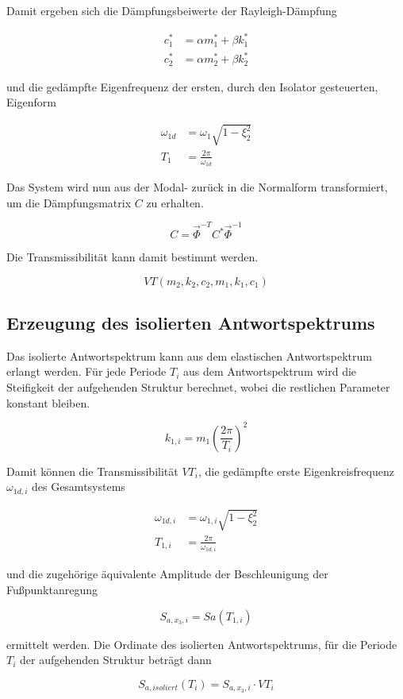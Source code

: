 Damit ergeben sich die Dämpfungsbeiwerte der Rayleigh-Dämpfung

\begin{align*}
c_1^* &= \alpha m_1^* + \beta k_1^*\\
c_2^* &= \alpha m_2^* + \beta k_2^*
\end{align*}

und die gedämpfte Eigenfrequenz der ersten, durch den Isolator gesteuerten, Eigenform  

\begin{align*}
\omega_{1d} &= \omega_1 \sqrt{1 - \xi_2^2}\\
T_1         &= \frac{2 \pi}{\omega_{1d}} 
\end{align*}

\pagebreak

Das System wird nun aus der Modal- zurück in die Normalform transformiert, um die Dämpfungsmatrix $C$ zu erhalten. \cite{Rayleigh}

\begin{equation*}
C = \vec{\Phi}^{-T} C^* \vec{\Phi}^{-1}
\end{equation*}

Die Transmissibilität kann damit bestimmt werden.

\begin{equation}
VT(m_2, k_2, c_2, m_1, k_1, c_1)
\end{equation}

\subsection{Erzeugung des isolierten Antwortspektrums}
\label{sec:transmAWS}

Das isolierte Antwortspektrum kann aus dem elastischen Antwortspektrum erlangt werden.
Für jede Periode $T_i$ aus dem Antwortspektrum wird die Steifigkeit der aufgehenden Struktur berechnet, wobei die restlichen Parameter konstant bleiben.

\begin{equation}
k_{1,i} = m_1 (\frac{2 \pi}{T_i})^2
\end{equation}
  
Damit können die Transmissibilität $VT_i$, die gedämpfte erste Eigenkreisfrequenz $\omega_{1d,i}$ des Gesamtsystems

\begin{align}
\omega_{1d,i} &= \omega_{1,i} \sqrt{1 - \xi_2^2} \\
T_{1,i} &= \frac{2 \pi}{\omega_{1d,i}}
\end{align}

und die zugehörige äquivalente Amplitude der Beschleunigung der Fußpunktanregung

\begin{equation}
S_{a,x_3,i} = Sa(T_{1,i})
\end{equation}

ermittelt werden. Die Ordinate des isolierten Antwortspektrums, für die Periode $T_i$ der aufgehenden Struktur beträgt dann

\begin{equation}
S_{a,isoliert}(T_i) = S_{a,x_3,i} \cdot VT_i
\end{equation}
  
\pagebreak
